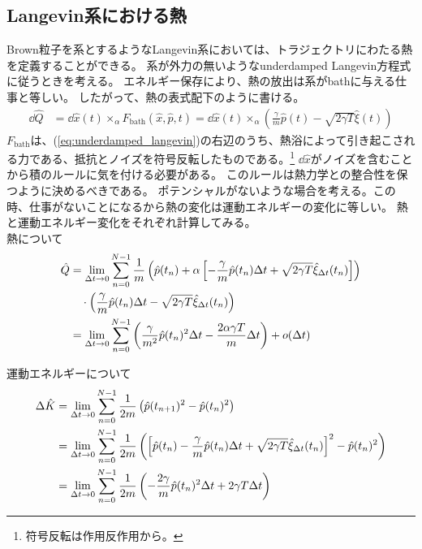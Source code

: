 \documentclass[a4paper,11pt]{jsarticle}
\numberwithin{equation}{section}
\begin{document}
\subsection{Langevin系における熱}
Brown粒子を系とするようなLangevin系においては、トラジェクトリにわたる熱を定義することができる。
系が外力の無いようなunderdamped Langevin方程式に従うときを考える。
エネルギー保存により、熱の放出は系がbathに与える仕事と等しい。
したがって、熱の表式配下のように書ける。
\begin{align}
\dd\hat{Q} &= \dd{\hat{x}(t)} \times_\alpha F_{\text{bath}}(\hat{x}, \hat{p}, t) 
= \dd{\hat{x}(t)} \times_\alpha \left( \frac{\gamma}{m} \hat{p}(t) - \sqrt{2\gamma T} \hat{\xi}(t) \right)
\end{align}
$F_{\text{bath}}$は、(\ref{eq:underdamped_langevin})の右辺のうち、熱浴によって引き起こされる力である、抵抗とノイズを符号反転したものである。\footnote{符号反転は作用反作用から。}
$\dd{\hat{x}}$がノイズを含むことから積のルールに気を付ける必要がある。
このルールは熱力学との整合性を保つように決めるべきである。
ポテンシャルがないような場合を考える。この時、仕事がないことになるから熱の変化は運動エネルギーの変化に等しい。
熱と運動エネルギー変化をそれぞれ計算してみる。\\
熱について
\begin{align}
\hat{Q} &= \lim_{\Delta t \to 0} \sum_{n=0}^{N-1} \frac{1}{m} \left( 
\hat{p}(t_n) + \alpha \left[ -\frac{\gamma}{m} \hat{p}(t_n) \Delta t + \sqrt{2\gamma T} \hat{\xi}_{\Delta t}(t_n) \right]
\right) \notag \\
& \quad \cdot \left( \frac{\gamma}{m} \hat{p}(t_n) \Delta t - \sqrt{2\gamma T} \hat{\xi}_{\Delta t}(t_n) \right) \notag \\
&= \lim_{\Delta t \to 0} \sum_{n=0}^{N-1} \left( 
\frac{\gamma}{m^2} \hat{p}(t_n)^2 \Delta t - \frac{2 \alpha \gamma T}{m} \Delta t
\right) + o(\Delta t)
\end{align}

運動エネルギーについて
\begin{align}
\Delta \hat{K} &= \lim_{\Delta t \to 0} \sum_{n=0}^{N-1} \frac{1}{2m} 
\left( \hat{p}(t_{n+1})^2 - \hat{p}(t_n)^2 \right) \notag \\
&= \lim_{\Delta t \to 0} \sum_{n=0}^{N-1} \frac{1}{2m} \left( 
\left[ \hat{p}(t_n) - \frac{\gamma}{m} \hat{p}(t_n) \Delta t + \sqrt{2\gamma T} \hat{\xi}_{\Delta t}(t_n) \right]^2 
- \hat{p}(t_n)^2 \right) \notag \\
&= \lim_{\Delta t \to 0} \sum_{n=0}^{N-1} \frac{1}{2m} 
\left( -\frac{2 \gamma}{m} \hat{p}(t_n)^2 \Delta t + 2\gamma T \Delta t \right)
\end{align}
\end{document}
